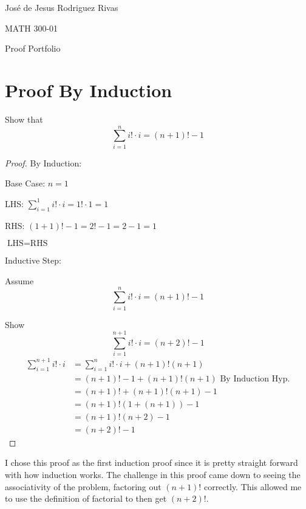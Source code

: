 \documentclass[12pt]{article}
\begin{document}
José de Jesus Rodriguez Rivas

MATH 300-01

\newcommand{\contradiction}{\Rightarrow\Leftarrow}

\begin{center}
Proof Portfolio
\end{center}
\section{Proof By Induction}

Show that
$$\sum_{i = 1}^{n} i! \cdot i = (n + 1)! - 1$$

\begin{proof}
By Induction:

Base Case: $n = 1$

LHS: $\sum_{i=1}^{1} i! \cdot i = 1! \cdot 1 = 1$

RHS: $(1 +1)! - 1 = 2! - 1 = 2 - 1 = 1$

$\text{LHS} = \text{RHS}$

Inductive Step: 

Assume 
$$\sum_{i = 1}^{n} i! \cdot i = (n + 1)! - 1$$

Show 
$$\sum_{i = 1}^{n+1} i! \cdot i = (n + 2)! - 1$$
\begin{align*}
\sum_{i = 1}^{n+1} i! \cdot i &= \sum_{i = 1}^{n} i! \cdot i + (n + 1)! (n+1)\\
&= (n+1)!-1 + (n + 1)!(n+1)\text{ By Induction Hyp.}\\
&= (n+1)! + (n+1)!(n+1)-1\\
&= (n+1)!(1 + (n+1)) - 1\\
&= (n+1)!(n+2)-1\\
&= (n+2)! - 1
\end{align*}
\end{proof}

\par
I chose this proof as the first induction proof since it is pretty straight forward with how induction works. The challenge in this proof came down to seeing the associativity of the problem, factoring out $(n+1)!$ correctly. This allowed me to use the definition of factorial to then get $(n+2)!$.
\end{document}
